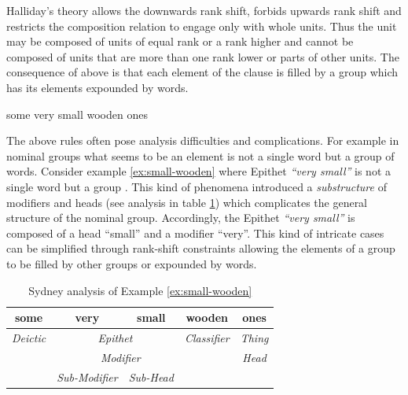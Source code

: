 
Halliday's theory allows the downwards rank shift, forbids upwards rank shift and restricts the composition relation to engage only with whole units. Thus the unit may be composed of units of equal rank or a rank higher and cannot be composed of units that are more than one rank lower or parts of other units. The consequence of above is that each element of the clause is filled by a group which has its elements expounded by words. 
\begin{exe}
	\ex \label{ex:small-wooden} some very small wooden ones
\end{exe}

The above rules often pose analysis difficulties and complications. For example in nominal groups what seems to be an element is not a single word but a group of words. Consider example \ref{ex:small-wooden} where Epithet \textit{``very small''} is not a single word but a group \citep[pp.~390--396]{Halliday2013}. This kind of phenomena introduced a \textit{substructure} of modifiers and heads (see analysis in table \ref{tab:example-substructure-analisys}) which complicates the general structure of the nominal group. Accordingly, the Epithet \textit{``very small''} is composed of a head ``small'' and a modifier ``very''. This kind of intricate cases can be simplified through rank-shift constraints allowing the elements of a group to be filled by other groups or expounded by words. 

\begin{table}[H]
	\centering
	\begin{tabular}{|c|c|c|c|c|}
		\hline
		\textbf{some} & \textbf{very} & \textbf{small} & \textbf{wooden} & \textbf{ones} \\ \hline
		\textit{Deictic} & \multicolumn{2}{c|}{\textit{Epithet}} & \textit{Classifier} & \textit{Thing} \\ \hline
		\multicolumn{4}{|c|}{\textit{Modifier}} & \textit{Head} \\ \hline
		\textit{} & \textit{Sub-Modifier} & \textit{Sub-Head} & \textit{} & \textit{} \\ \hline
	\end{tabular}
	\caption{Sydney analysis of Example \ref{ex:small-wooden}}
	\label{tab:example-substructure-analisys}
\end{table}

